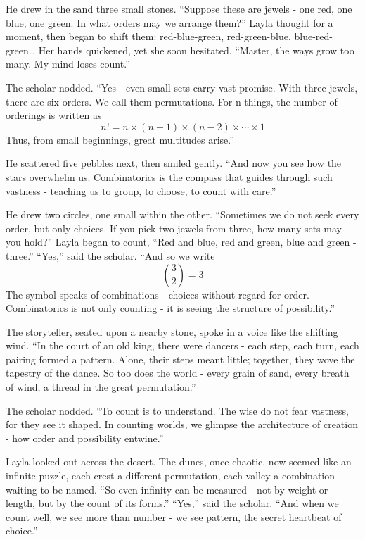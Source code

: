 \documentclass[
  letterpaper,
  DIV=11,
  numbers=noendperiod]{scrreprt}
\begin{document}
He drew in the sand three small stones. ``Suppose these are jewels - one
red, one blue, one green. In what orders may we arrange them?'' Layla
thought for a moment, then began to shift them: red-blue-green,
red-green-blue, blue-red-green\ldots{} Her hands quickened, yet she soon
hesitated. ``Master, the ways grow too many. My mind loses count.''

The scholar nodded. ``Yes - even small sets carry vast promise. With
three jewels, there are six orders. We call them permutations. For n
things, the number of orderings is written as \[
n! = n \times (n-1) \times (n-2) \times \cdots \times 1
\] Thus, from small beginnings, great multitudes arise.''

He scattered five pebbles next, then smiled gently. ``And now you see
how the stars overwhelm us. Combinatorics is the compass that guides
through such vastness - teaching us to group, to choose, to count with
care.''

He drew two circles, one small within the other. ``Sometimes we do not
seek every order, but only choices. If you pick two jewels from three,
how many sets may you hold?'' Layla began to count, ``Red and blue, red
and green, blue and green - three.'' ``Yes,'' said the scholar. ``And so
we write \[
\binom{3}{2} = 3
\] The symbol speaks of combinations - choices without regard for order.
Combinatorics is not only counting - it is seeing the structure of
possibility.''

The storyteller, seated upon a nearby stone, spoke in a voice like the
shifting wind. ``In the court of an old king, there were dancers - each
step, each turn, each pairing formed a pattern. Alone, their steps meant
little; together, they wove the tapestry of the dance. So too does the
world - every grain of sand, every breath of wind, a thread in the great
permutation.''

The scholar nodded. ``To count is to understand. The wise do not fear
vastness, for they see it shaped. In counting worlds, we glimpse the
architecture of creation - how order and possibility entwine.''

Layla looked out across the desert. The dunes, once chaotic, now seemed
like an infinite puzzle, each crest a different permutation, each valley
a combination waiting to be named. ``So even infinity can be measured -
not by weight or length, but by the count of its forms.'' ``Yes,'' said
the scholar. ``And when we count well, we see more than number - we see
pattern, the secret heartbeat of choice.''
\end{document}
